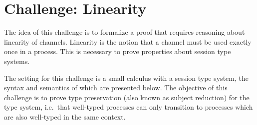 \documentclass[a4paper]{article}
\begin{document}
\section{Challenge: Linearity}
The idea of this challenge is to formalize a proof that requires reasoning about linearity of channels.
Linearity is the notion that a channel must be used exactly once in a process.
This is necessary to prove properties about session type systems.

The setting for this challenge is a small calculus with a session type system, the syntax and semantics of which are presented below.
The objective of this challenge is to prove type preservation (also known as subject reduction) for the type system, i.e.\ that well-typed processes can only transition to processes which are also well-typed in the same context.
\end{document}
